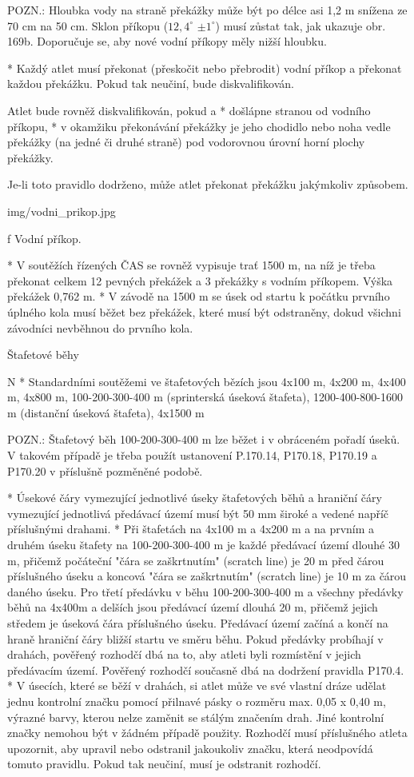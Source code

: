 POZN.: Hloubka vody na straně překážky může být po délce asi 1,2 m snížena ze 70 cm na 50 cm. Sklon příkopu ($12,4^\circ$ $\pm1^\circ$) musí zůstat tak, jak ukazuje obr. 169b. Doporučuje se, aby nové vodní příkopy měly nižší hloubku.

* Každý atlet musí překonat (přeskočit nebo přebrodit) vodní příkop a překonat každou překážku. Pokud tak neučiní, bude diskvalifikován.

Atlet bude rovněž diskvalifikován, pokud
  \begitems \style a
  * došlápne stranou od vodního příkopu,
  * v okamžiku překonávání překážky je jeho chodidlo nebo noha vedle překážky (na jedné či druhé straně) pod vodorovnou úrovní horní plochy překážky.
  \enditems

Je-li toto pravidlo dodrženo, může atlet překonat překážku jakýmkoliv způsobem.

\picw=8cm \inspic img/vodni_prikop.jpg
\caption/f Vodní příkop.

* V soutěžích řízených ČAS se rovněž vypisuje trať 1500 m, na níž je třeba překonat celkem 12 pevných překážek a 3 překážky s vodním příkopem. Výška překážek 0,762 m.
* V závodě na 1500 m se úsek od startu k počátku prvního úplného kola musí běžet bez překážek, které musí být odstraněny, dokud všichni závodníci nevběhnou do prvního kola.
\enditems

\secc Štafetové běhy

\begitems \style N
* Standardními soutěžemi ve štafetových bězích jsou 4x100 m, 4x200 m, 4x400 m, 4x800 m, 100-200-300-400 m (sprinterská úseková štafeta), 1200-400-800-1600 m (distanční úseková štafeta), 4x1500 m

POZN.: Štafetový běh 100-200-300-400 m lze běžet i v obráceném pořadí úseků. V takovém případě je třeba použít ustanovení P.170.14, P170.18, P170.19 a P170.20 v příslušně pozměněné podobě.

* Úsekové čáry vymezující jednotlivé úseky štafetových běhů a hraniční čáry vymezující jednotlivá předávací území musí být  50 mm široké a vedené napříč příslušnými drahami.
* Při štafetách na 4x100 m a 4x200 m a na prvním a druhém úseku štafety na 100-200-300-400 m je každé předávací území dlouhé 30 m, přičemž počáteční "čára se zaškrtnutím" (scratch line) je 20 m před čárou příslušného úseku a koncová "čára se zaškrtnutím" (scratch line) je 10 m za čárou daného úseku. Pro třetí předávku v běhu 100-200-300-400 m a všechny předávky běhů na 4x400m a delších jsou předávací území dlouhá 20 m, přičemž jejich středem je úseková čára příslušného úseku. Předávací území začíná a končí na hraně hraniční čáry bližší startu ve směru běhu. Pokud předávky probíhají v drahách, pověřený rozhodčí dbá na to, aby atleti byli rozmístění v jejich předávacím území. Pověřený rozhodčí současně dbá na dodržení pravidla P170.4.
* V úsecích, které se běží v drahách, si atlet může ve své vlastní dráze udělat jednu kontrolní značku pomocí přilnavé pásky o rozměru max. 0,05 x 0,40 m, výrazné barvy, kterou nelze zaměnit se stálým značením drah. Jiné kontrolní značky nemohou být v žádném případě použity. Rozhodčí musí příslušného atleta upozornit, aby upravil nebo odstranil jakoukoliv značku, která neodpovídá tomuto pravidlu. Pokud tak neučiní, musí je odstranit rozhodčí.

